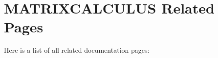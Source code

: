 \section{MATRIXCALCULUS Related Pages}
Here is a list of all related documentation pages:\begin{CompactList}
\item {}

\item {}

\end{CompactList}
